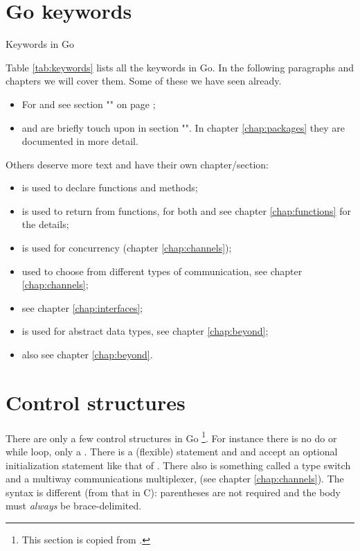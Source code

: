 \section{Go keywords}
\begin{table}[H]
\begin{center}
\caption{Keywords in Go}
\label{tab:keywords}

\end{center}
\end{table}
Table \ref{tab:keywords} lists all the keywords in Go. 
In the following paragraphs and chapters we will cover them. Some
of these we have seen already.
\begin{itemize}
\item For  and  see section "" on 
page \pageref{sec:vars};
\item {} and  are briefly touch upon in section "". 
In chapter \ref{chap:packages} they are documented in more detail.
\end{itemize}
Others deserve more text and have their own chapter/section:
\begin{itemize}
\item {} is used to declare functions and methods;
\item {} is used to return from functions, for both 
and  see chapter \ref{chap:functions} for the details;
\item {} is used for concurrency (chapter \ref{chap:channels});
\item {} used to choose from different types of communication, see chapter \ref{chap:channels};
\item {} see chapter \ref{chap:interfaces};
\item {} is used for abstract data types, see chapter \ref{chap:beyond};
\item {} also see chapter \ref{chap:beyond}.
\end{itemize}

\section{Control structures}
There are only a few control structures in 
Go \footnote{This section is copied from \cite{effective_go}.}.
For instance there is no do or while loop, only a 
. There is a (flexible)  statement and  and
 accept an
optional initialization statement like that of . There also is
something called a type switch and a multiway communications
multiplexer,  (see chapter \ref{chap:channels}). The syntax is 
different (from that in C): parentheses
are not required and the body must \emph{always} be brace-delimited.

